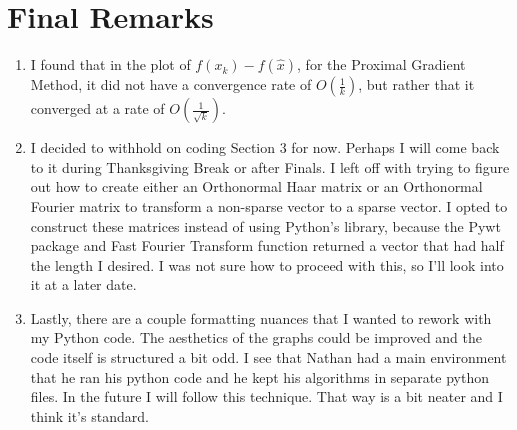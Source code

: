 \documentclass{article}
\begin{document}
\newpage

\section{Final Remarks}
\begin{enumerate}
    \item I found that in the plot of $f(x_{k}) - f(\hat{x})$, for the Proximal Gradient Method, it did not have a convergence rate of $O(\frac{1}{k})$, but rather that it converged at a rate of $O(\frac{1}{\sqrt{k}})$. 
    \item I decided to withhold on coding Section 3 for now. Perhaps I will come back to it during Thanksgiving Break or after Finals. I left off with trying to figure out how to create either an Orthonormal Haar matrix or an Orthonormal Fourier matrix to transform a non-sparse vector to a sparse vector. I opted to construct these matrices instead of using Python's library, because the Pywt package and Fast Fourier Transform function returned a vector that had half the length I desired. I was not sure how to proceed with this, so I'll look into it at a later date. 
    \item Lastly, there are a couple formatting nuances that I wanted to rework with my Python code. The aesthetics of the graphs could be improved and the code itself is structured a bit odd. I see that Nathan had a main environment that he ran his python code and he kept his algorithms in separate python files. In the future I will follow this technique. That way is a bit neater and I think it's standard.
\end{enumerate}


\printbibliography
\end{document}
